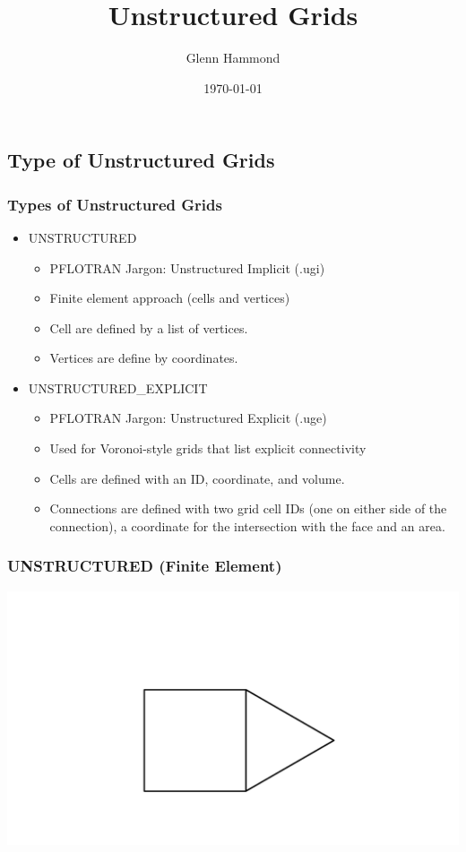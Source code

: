 \documentclass{beamer}
\title{Unstructured Grids}
\author{Glenn Hammond}
\date{\today}
\begin{document}
  
\frame{\titlepage}


\subsection{Type of Unstructured Grids}

\begin{frame}[fragile]\frametitle{Types of Unstructured  Grids}

\begin{itemize}
  \item UNSTRUCTURED
  \begin{itemize}
     \item PFLOTRAN Jargon: Unstructured Implicit (.ugi)
     \item Finite element approach (cells and vertices)
     \item Cell are defined by a list of vertices.
     \item Vertices are define by coordinates.
   \end{itemize}
  \item UNSTRUCTURED\_EXPLICIT
  \begin{itemize}
     \item PFLOTRAN Jargon: Unstructured Explicit (.uge)
    \item Used for Voronoi-style grids that list explicit connectivity
    \item Cells are defined with an ID, coordinate, and volume.
    \item Connections are defined with two grid cell IDs (one on either side of the connection), a coordinate for the intersection with the face and an area.
  \end{itemize}
\end{itemize}

\end{frame}

\begin{frame}[fragile]\frametitle{UNSTRUCTURED (Finite Element)}
\vspace{0.2in}
\centering
\includegraphics[width=1\linewidth]{./fe_geom}
\end{frame}
\end{document}
